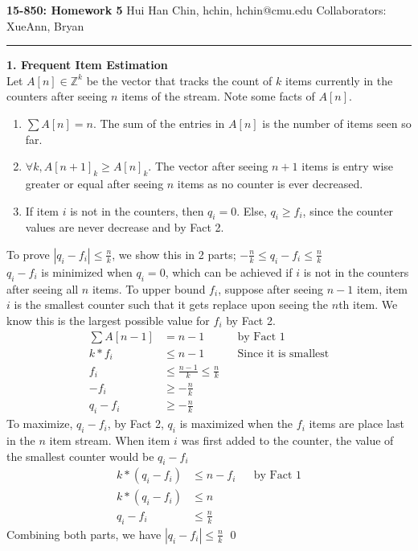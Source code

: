 \documentclass[11pt]{article}
\makeatletter
\newcommand{\qpart}[1]{\vspace{0.1cm}\textbf{#1}\\ }
\newcommand{\Z}{\mathbb{Z}}
\newcommand{\customtitle}[1]{\raggedright \textbf{15-850: #1} \hspace{1.0cm} 
 Hui Han Chin, hchin, hchin@cmu.edu \hspace{1.0cm} Collaborators: XueAnn, Bryan \\ \hrule \vspace{0.2cm}}
\makeatother
\begin{document}
\customtitle{Homework 5}
\qpart{1. Frequent Item Estimation}
Let $A[n]\in \Z^k$ be the vector that tracks the count of $k$ items currently in the counters after seeing $n$ items of the stream. Note some facts of $A[n]$. 
\begin{enumerate}
\item $\sum A[n] = n$. The sum of the entries in $A[n]$ is the number of items seen so far. 
\item $\forall k, A[n+1]_k \geq A[n]_k$. The vector after seeing $n+1$ items is entry wise greater or equal after seeing $n$ items as no counter is ever decreased. 
\item If item $i$ is not in the counters, then $q_i=0$. Else, $q_i \geq f_i$, since the counter values are never decrease and by Fact 2.
\end{enumerate}
To prove $|q_i - f_i| \leq \frac{n}{k}$, we show this in 2 parts; $-\frac{n}{k} \leq q_i - f_i \leq \frac{n}{k}$ \\
$q_i - f_i$ is minimized when $q_i=0$, which can be achieved if $i$ is not in the counters after seeing all $n$ items. To upper bound $f_i$, suppose after seeing $n-1$ item, item $i$ is the smallest counter such that it gets replace upon seeing the $n$th item. We know this is the largest possible value for $f_i$ by Fact 2.
\begin{align*}
\sum A[n-1] &= n-1 &&\text{by Fact 1} \\
k * f_i &\leq n-1 && \text{Since it is smallest} \\
f_i &\leq \frac{n-1}{k} \leq \frac{n}{k}\\
-f_i &\geq -\frac{n}{k} \\
q_i -f_i &\geq -\frac{n}{k} 
\end{align*}
To maximize, $q_i - f_i$, by Fact 2, $q_i$ is maximized when the $f_i$ items are place last in the $n$ item stream. When item $i$ was first added to the counter, the value of the smallest counter would be $q_i - f_i$
\begin{align*}
k*(q_i-f_i) &\leq n-f_i &&\text{by Fact 1}\\
k*(q_i-f_i) &\leq n \\
q_i-f_i &\leq \frac{n}{k}
\end{align*}
Combining both parts, we have $|q_i-f_i|\leq \frac{n}{k}$ \qed \bigskip \\
\newpage
\end{document}
